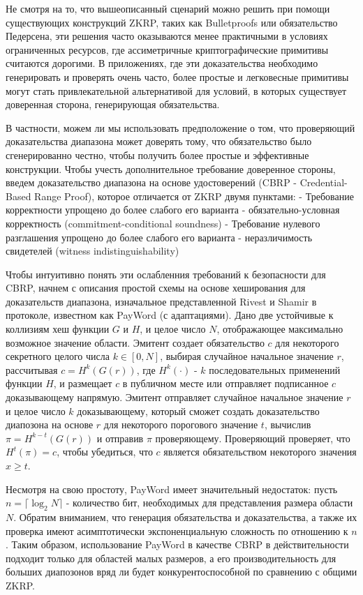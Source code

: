 Не смотря на то, что вышеописанный сценарий можно решить при помощи существующих конструкций ZKRP, таких как Bulletproofs или обязательство Педерсена, эти решения часто оказываются менее практичными в условиях ограниченных ресурсов, где ассиметричные криптографические примитивы считаются дорогими.
В приложениях, где эти доказательства необходимо генерировать и проверять очень часто, более простые и легковесные примитивы могут стать привлекательной альтернативой для условий, в которых существует доверенная сторона, генерирующая обязательства.

В частности, можем ли мы использовать предположение о том, что проверяющий доказательства диапазона может доверять тому, что обязательство было сгенерированно честно, чтобы получить более простые и эффективные конструкции.
Чтобы учесть дополнительное требование доверенное стороны, введем доказательство диапазона на основе удостоверений (CBRP - Credential-Based Range Proof), которое отличается от ZKRP двумя пунктами:
- Требование корректности упрощено до более слабого его варианта - обязательно-условная корректность (commitment-conditional soundness)
- Требование нулевого разглашения упрощено до более слабого его варианта - неразличимость свидетелей (witness indistinguishability)

Чтобы интуитивно понять эти ослабленния требований к безопасности для CBRP, начнем с описания простой схемы на основе хеширования для доказательств диапазона, изначальное представленной Rivest и Shamir \cite{10.1007/3-540-62494-5_6} в протоколе, известном как PayWord (с адаптациями).
Дано две устойчивые к коллизиям хеш функции $G$ и $H$, и целое число $N$, отображающее максимально возможное значение области.
Эмитент создает обязательство $c$ для некоторого секретного целого числа $k \in [0, N]$, выбирая случайное начальное значение $r$, рассчитывая $c = H^k(G(r))$, где $H^k(\cdot)$ - $k$ последовательных применений функции $H$, и размещает $c$ в публичном месте или отправляет подписанное $c$ доказывающему напрямую.
Эмитент отправляет случайное начальное значение $r$ и целое число $k$ доказывающему, который сможет создать доказательство диапозона на основе $r$ для некоторого порогового значение $t$, вычислив $\pi = H^{k - t}(G(r))$ и отправив $\pi$ проверяющему.
Проверяющий проверяет, что $H^t(\pi) = c$, чтобы убедиться, что $c$ является обязательством некоторого значения $x \geq t$.

Несмотря на свою простоту, PayWord имеет значительный недостаток: пусть $n = \lceil \log_2 N \rceil$ - количество бит, необходимых для представления размера области $N$.
Обратим вниманием, что генерация обязательства и доказательства, а также их проверка имеют асимптотически экспоненциальную сложность по отношению к $n$.
Таким образом, использование PayWord в качестве CBRP в действительности подходит только для областей малых размеров, а его производительность для больших диапозонов вряд ли будет конкурентоспособной по сравнению с общими ZKRP.

